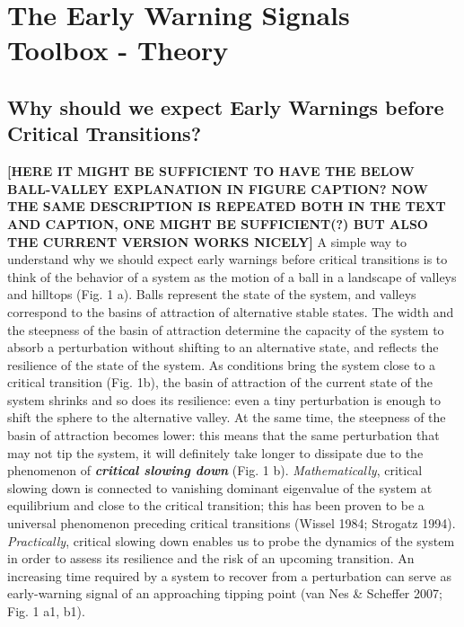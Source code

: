 \documentclass[12pt,a4paper,final]{article}
\begin{document}
\section{The Early Warning Signals Toolbox - Theory} 

\subsection{Why should we expect Early Warnings before Critical Transitions?}
{\bf [HERE IT MIGHT BE SUFFICIENT TO HAVE THE BELOW BALL-VALLEY EXPLANATION IN FIGURE CAPTION? NOW THE SAME DESCRIPTION IS REPEATED BOTH IN THE TEXT AND CAPTION, ONE MIGHT BE SUFFICIENT(?) BUT ALSO THE CURRENT VERSION WORKS NICELY]}
A simple way to understand why we should expect early warnings before critical transitions is to think of the behavior of a system as the motion of a ball in a landscape of valleys and hilltops (Fig. 1 a). Balls represent the state of the system, and valleys correspond to the basins of attraction of alternative stable states. The width and the steepness of the basin of attraction determine the capacity of the system to absorb a perturbation without shifting to an alternative state, and reflects the resilience of the state of the system. As conditions bring the system close to a critical transition (Fig. 1b), the basin of attraction of the current state of the system shrinks and so does its resilience: even a tiny perturbation is enough to shift the sphere to the alternative valley. At the same time, the steepness of the basin of attraction becomes lower: this means that the same perturbation that may not tip the system, it will definitely take longer to dissipate due to the phenomenon of \textit{\textbf{critical slowing down}} (Fig. 1 b). \textit{Mathematically}, critical slowing down is connected to vanishing dominant eigenvalue of the system at equilibrium and close to the critical transition; this has been proven to be a universal phenomenon preceding critical transitions  (Wissel 1984; Strogatz 1994). \textit{Practically}, critical slowing down enables us to probe the dynamics of the system in order to assess its resilience and the risk of an upcoming transition. An increasing time required by a system to recover from a perturbation can serve as early-warning signal of an approaching tipping point (van Nes \& Scheffer 2007; Fig. 1 a1, b1).
\end{document}
